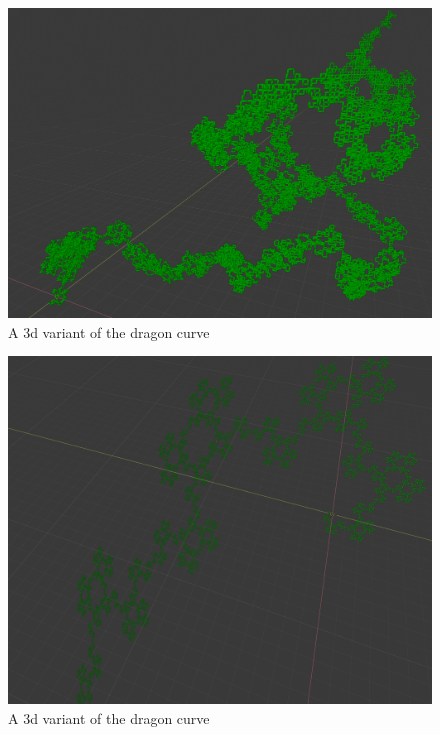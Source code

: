 \begin{figure}[h]
    \centering
    \includegraphics[width=\textwidth]{figures/L-systems/dragon1-3d.png}
    \caption{A 3d variant of the dragon curve}
\end{figure}

\begin{figure}[h]
    \centering
    \includegraphics[width=\textwidth]{figures/L-systems/dragon2-3d.png}
    \caption{A 3d variant of the dragon curve}
\end{figure}

